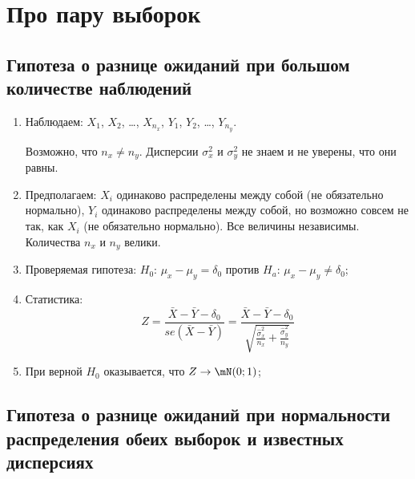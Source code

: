 \documentclass[12pt, a4paper, oneside]{article}
\begin{document}
\newpage 

\section{Про пару выборок}

\subsection*{Гипотеза о разнице ожиданий при большом количестве наблюдений}

\begin{enumerate}
    \item Наблюдаем: $X_1$, $X_2$, \ldots, $X_{n_x}$, $Y_1$, $Y_2$, \ldots, $Y_{n_y}$.
    
    Возможно, что $n_x \neq n_y$. Дисперсии $\sigma^2_x$ и $\sigma^2_y$ не знаем и не уверены, что они равны.
    
    \item Предполагаем: $X_i$ одинаково распределены между собой (не обязательно нормально),
    $Y_i$ одинаково распределены между собой, но возможно совсем не так, как $X_i$ (не обязательно нормально).
    Все величины независимы. Количества $n_x$ и $n_y$ велики.
    
    \item Проверяемая гипотеза: $H_0$: $\mu_x - \mu_y = \delta_0$ против $H_a$: $\mu_x - \mu_y \neq \delta_0$;
    
    \item Статистика:
    \[
    Z = \frac{\bar X - \bar Y - \delta_0}{se(\bar X - \bar Y)} =
    \frac{\bar X - \bar Y - \delta_0}{\sqrt{\frac{\hat \sigma^2_x}{n_x}+\frac{\hat\sigma^2_y}{n_y}}}
    \]
    
    \item При верной $H_0$ оказывается, что $Z \to \mN(0;1)$;
\end{enumerate}


\subsection*{Гипотеза о разнице ожиданий при нормальности распределения обеих выборок и известных дисперсиях}
\end{document}
